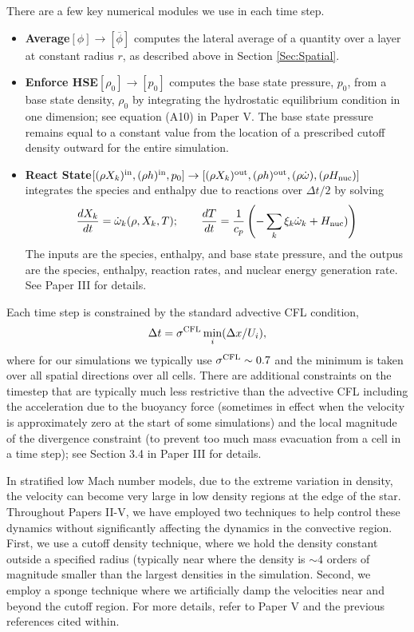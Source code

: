 There are a few key numerical modules we use in each time step.
\begin{itemize}
\item {\bf Average}$[\phi]\rightarrow[\overline\phi]$ computes the lateral average of a quantity over a layer at constant radius $r$, as described above in Section \ref{Sec:Spatial}.
\item {\bf Enforce HSE}$[\rho_0]\rightarrow[p_0]$ computes the base state pressure, $p_0$, from a base state density, $\rho_0$ by integrating the hydrostatic equilibrium condition in one dimension; see equation (A10) in Paper V.  The base state pressure remains equal to a constant value from the location of a prescribed cutoff density outward for the entire simulation.
\item {\bf React State}$[(\rho X_k)^{\rm in},(\rho h)^{\rm in},p_0]\rightarrow[(\rho X_k)^{\rm out},(\rho h)^{\rm out},(\rho\dot\omega),(\rho H_{\rm nuc})]$ integrates the species and enthalpy due to reactions over $\Delta t/2$ by solving
\begin{equation}
\frac{dX_k}{dt} = \dot\omega_k(\rho,X_k,T); \qquad
\frac{dT}{dt} = \frac{1}{c_p}\left(-\sum_k\xi_k\dot\omega_k + H_{\rm nuc})\right)
\end{equation}
The inputs are the species, enthalpy, and base state pressure, and the outpus are the species, enthalpy, reaction rates, and nuclear energy generation rate.
See Paper III for details.
\end{itemize}
Each time step is constrained by the standard advective CFL condition,
\begin{equation}
\Delta t = \sigma^{\rm CFL} \min_i(\Delta x / U_i),
\end{equation}
where for our simulations we typically use $\sigma^{\rm CFL}\sim 0.7$ and the minimum is taken over all spatial directions over all cells.
There are additional constraints on the timestep that are typically much less restrictive than the advective CFL including
the acceleration due to the buoyancy force (sometimes in effect when the velocity is approximately zero at the start of some simulations) 
and the local magnitude of the divergence constraint (to prevent too much mass evacuation from a cell in a time step); see Section 3.4 in Paper III for details.

In stratified low Mach number models, due to the extreme variation in density, the velocity can become very large in low density regions at the edge of the star.
Throughout Papers II-V, we have employed two techniques to help control these dynamics without significantly affecting the dynamics in the convective region.
First, we use a cutoff density technique, where we hold the density constant outside a specified radius (typically near where the density is $\sim$4 orders of magnitude smaller than the largest densities in the simulation.
Second, we employ a sponge technique where we artificially damp the velocities near and beyond the cutoff region.
For more details, refer to Paper V and the previous references cited within.

